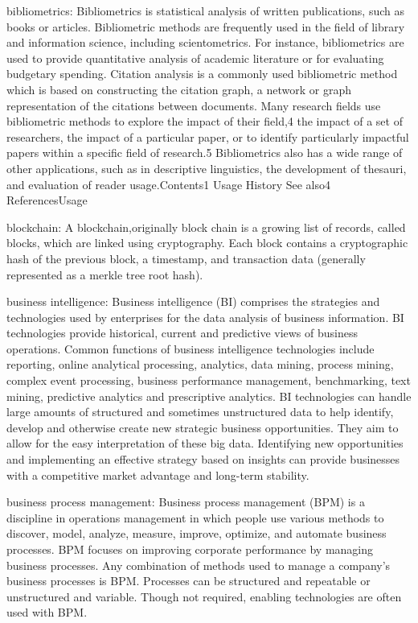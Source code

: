 \documentclass[]{book}
\begin{document}
bibliometrics: Bibliometrics is statistical analysis of written
publications, such as books or articles. Bibliometric methods are
frequently used in the field of library and information science,
including scientometrics. For instance, bibliometrics are used to
provide quantitative analysis of academic literature or for evaluating
budgetary spending. Citation analysis is a commonly used bibliometric
method which is based on constructing the citation graph, a network or
graph representation of the citations between documents. Many research
fields use bibliometric methods to explore the impact of their field,4
the impact of a set of researchers, the impact of a particular paper, or
to identify particularly impactful papers within a specific field of
research.5 Bibliometrics also has a wide range of other applications,
such as in descriptive linguistics, the development of thesauri, and
evaluation of reader usage.Contents1 Usage History See also4
ReferencesUsage

blockchain: A blockchain,originally block chain is a growing list of
records, called blocks, which are linked using cryptography. Each block
contains a cryptographic hash of the previous block, a timestamp, and
transaction data (generally represented as a merkle tree root hash).

business intelligence: Business intelligence (BI) comprises the
strategies and technologies used by enterprises for the data analysis of
business information. BI technologies provide historical, current and
predictive views of business operations. Common functions of business
intelligence technologies include reporting, online analytical
processing, analytics, data mining, process mining, complex event
processing, business performance management, benchmarking, text mining,
predictive analytics and prescriptive analytics. BI technologies can
handle large amounts of structured and sometimes unstructured data to
help identify, develop and otherwise create new strategic business
opportunities. They aim to allow for the easy interpretation of these
big data. Identifying new opportunities and implementing an effective
strategy based on insights can provide businesses with a competitive
market advantage and long-term stability.

business process management: Business process management (BPM) is a
discipline in operations management in which people use various methods
to discover, model, analyze, measure, improve, optimize, and automate
business processes. BPM focuses on improving corporate performance by
managing business processes. Any combination of methods used to manage a
company's business processes is BPM. Processes can be structured and
repeatable or unstructured and variable. Though not required, enabling
technologies are often used with BPM.
\end{document}

